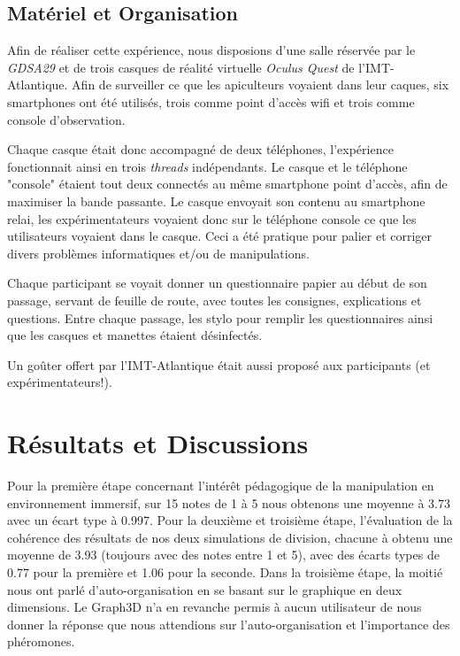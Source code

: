 		
		\subsection{Matériel et Organisation}
		Afin de réaliser cette expérience, nous disposions d'une salle réservée par le \textit{GDSA29} et de trois casques de réalité virtuelle \textit{Oculus Quest} de l'IMT-Atlantique. Afin de surveiller ce que les apiculteurs voyaient dans leur caques, six smartphones ont été utilisés, trois comme point d'accès wifi et trois comme console d'observation.
		
		Chaque casque était donc accompagné de deux téléphones, l'expérience fonctionnait ainsi en trois \textit{threads} indépendants. Le casque et le téléphone "console" étaient tout deux connectés au même smartphone point d'accès, afin de maximiser la bande passante. Le casque envoyait son contenu au smartphone relai, les expérimentateurs voyaient donc sur le téléphone console ce que les utilisateurs voyaient dans le casque. Ceci a été pratique pour palier et corriger divers problèmes informatiques et/ou de manipulations.
		
		Chaque participant se voyait donner un questionnaire papier au début de son passage, servant de feuille de route, avec toutes les consignes, explications et questions. Entre chaque passage, les stylo pour remplir les questionnaires ainsi que les casques et manettes étaient désinfectés. 
		
		Un goûter offert par l'IMT-Atlantique était aussi proposé aux participants (et expérimentateurs!).
		
		
		
	\section{Résultats et Discussions}
	Pour la première étape concernant l'intérêt pédagogique de la manipulation en environnement immersif, sur 15 notes de 1 à 5 nous obtenons une moyenne à 3.73 avec un écart type à 0.997.
    Pour la deuxième et troisième étape, l'évaluation de la cohérence des résultats de nos deux simulations de division, chacune à obtenu une moyenne de 3.93 (toujours avec des notes entre 1 et 5), avec des écarts types de 0.77 pour la première et 1.06 pour la seconde.
    Dans la troisième étape, la moitié nous ont parlé d'auto-organisation en se basant sur le graphique en deux dimensions. Le Graph3D n'a en revanche permis à aucun utilisateur de nous donner la réponse que nous attendions sur l'auto-organisation et l'importance des phéromones. 

